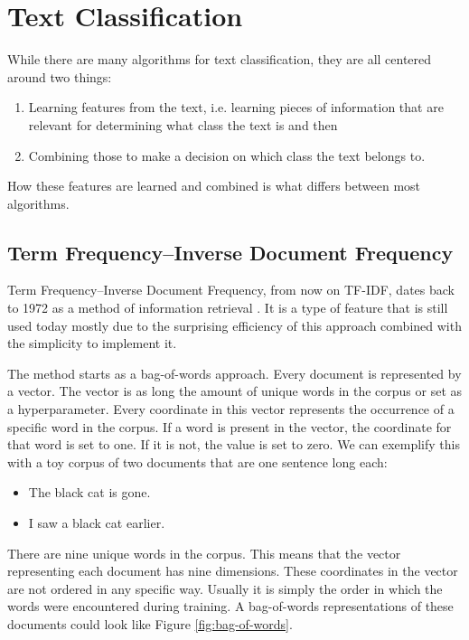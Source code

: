 \documentclass[nofilelist]{cslthse-msc}
\begin{document}
\section{Text Classification}

While there are many algorithms for text classification, they are all centered around two things:
\begin{enumerate}
    \item Learning features from the text, i.e. learning pieces of information that are relevant for determining what class the text is and then
    \item Combining those to make a decision on which class the text belongs to. 
\end{enumerate}

How these features are learned and combined is what differs between most algorithms.

\subsection{Term Frequency--Inverse Document Frequency}

Term Frequency--Inverse Document Frequency, from now on TF-IDF, dates back to 1972 as a method of information retrieval \citep{jones1972statistical}. It is a type of feature that is still used today mostly due to the surprising efficiency of this approach combined with the simplicity to implement it.

The method starts as a bag-of-words approach. Every document is represented by a vector. The vector is as long the amount of unique words in the corpus or set as a hyperparameter. Every coordinate in this vector represents the occurrence of a specific word in the corpus. If a word is present in the vector, the coordinate for that word is set to one. If it is not, the value is set to zero. We can exemplify this with a toy corpus of two documents that are one sentence long each:

\begin{itemize}
    \item The black cat is gone.
    \item I saw a black cat earlier.
\end{itemize}

There are nine unique words in the corpus. This means that the vector representing each document has nine dimensions. These coordinates in the vector are not ordered in any specific way. Usually it is simply the order in which the words were encountered during training. A bag-of-words representations of these documents could look like Figure \ref{fig:bag-of-words}.
\end{document}
